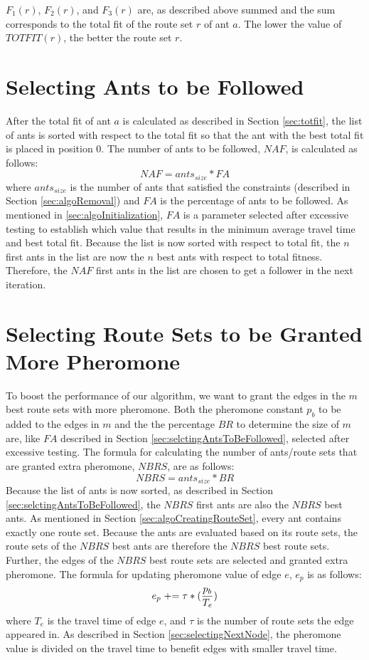 $F_{1}(r)$, $F_{2}(r)$, and $F_{3}(r)$ are, as described above summed and the sum corresponds to the total fit of the route set $r$ of ant $a$. The lower the value of $TOTFIT(r)$, the better the route set $r$. 

\section{Selecting Ants to be Followed}
\label{sec:selctingAntsToBeFollowed}
After the total fit of ant $a$ is calculated as described in Section \vref{sec:totfit}, the list of ants is sorted with respect to the total fit so that the ant with the best total fit is placed in position 0. The number of ants to be followed, $NAF$, is calculated as follows:
\newline
$$NAF = ants_{size} * FA$$
\newline 
where $ants_{size}$ is the number of ants that satisfied the constraints (described in Section \vref{sec:algoRemoval}) and $FA$ is the percentage of ants to be followed. As mentioned in \vref{sec:algoInitialization}, $FA$ is a parameter selected after excessive testing to establish which value that results in the minimum average travel time and best total fit. Because the list is now sorted with respect to total fit, the $n$ first ants in the list are now the $n$ best ants with respect to total fitness. Therefore, the $NAF$ first ants in the list are chosen to get a follower in the next iteration. 

\section{Selecting Route Sets to be Granted More Pheromone}
To boost the performance of our algorithm, we want to grant the edges in the $m$ best route sets with more pheromone. Both the pheromone constant $p_b$ to be added to the edges in $m$ and the the percentage $BR$ to determine the size of $m$ are, like $FA$ described in Section \vref{sec:selctingAntsToBeFollowed}, selected after excessive testing. The formula for calculating the number of ants/route sets that are granted extra pheromone, $NBRS$, are as follows:
\newline
$$NBRS = ants_{size} * BR$$
\newline
Because the list of ants is now sorted, as described in Section \vref{sec:selctingAntsToBeFollowed}, the $NBRS$ first ants are also the $NBRS$ best ants. As mentioned in Section \vref{sec:algoCreatingRouteSet}, every ant contains exactly one route set. Because the ants are evaluated based on its route sets, the route sets of the $NBRS$ best ants are therefore the $NBRS$ best route sets. Further, the edges of the $NBRS$ best route sets are selected and granted extra pheromone. The formula for updating pheromone value of edge $e$, $e_p$ is as follows:
\newline
$$e_p \mathrel{+}= \tau*(\frac{p_b}{T_e})$$ 
\newline
where $T_e$ is the travel time of edge $e$, and $\tau$ is the number of route sets the edge appeared in. As described in Section \vref{sec:selectingNextNode}, the pheromone value is divided on the travel time to benefit edges with smaller travel time. 